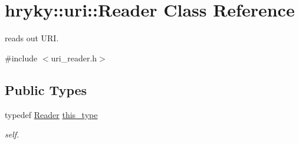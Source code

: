 \hypertarget{classhryky_1_1uri_1_1_reader}{\section{hryky\-:\-:uri\-:\-:Reader Class Reference}
\label{classhryky_1_1uri_1_1_reader}
}


reads out U\-R\-I.  




{\ttfamily \#include $<$uri\-\_\-reader.\-h$>$}

\subsection*{Public Types}
\begin{DoxyCompactItemize}
\item 
\hypertarget{classhryky_1_1uri_1_1_reader_aba573908840f955a5cdb7b9d205474c8}{typedef \hyperlink{classhryky_1_1uri_1_1_reader}{Reader} \hyperlink{classhryky_1_1uri_1_1_reader_aba573908840f955a5cdb7b9d205474c8}{this\-\_\-type}}\label{classhryky_1_1uri_1_1_reader_aba573908840f955a5cdb7b9d205474c8}

\begin{DoxyCompactList}\small\item\em self. \end{DoxyCompactList}\end{DoxyCompactItemize}
